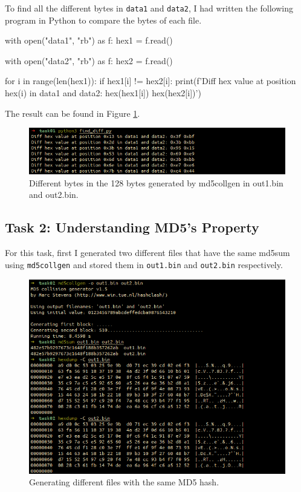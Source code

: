 \documentclass{article}
\begin{document}
To find all the different bytes in \texttt{data1} and \texttt{data2}, I had written
the following program in Python to compare the bytes of each file.

\begin{python}
with open("data1", "rb") as f:
    hex1 = f.read()

with open("data2", "rb") as f:
    hex2 = f.read()

for i in range(len(hex1)):
    if hex1[i] != hex2[i]:
        print(f'Diff hex value at position {hex(i)} in data1 and data2: {hex(hex1[i])} {hex(hex2[i])}')
\end{python}

The result can be found in Figure \ref{fig:task1_question3_result}.

\begin{figure}[!ht]
    \centering
    \includegraphics[scale=0.5]{task1.3.1.png}
    \caption{Different bytes in the 128 bytes generated by md5collgen in out1.bin and out2.bin.}
    \label{fig:task1_question3_result}
\end{figure}

\subsection{Task 2: Understanding MD5's Property}

For this task, first I generated two different files that have the same md5sum
using \texttt{md5collgen} and stored them in \texttt{out1.bin} and \texttt{out2.bin}
respectively.

\begin{figure}[!ht]
    \centering
    \includegraphics[scale=0.5]{task2.1.png}
    \caption{Generating different files with the same MD5 hash.}
\end{figure}
\end{document}
